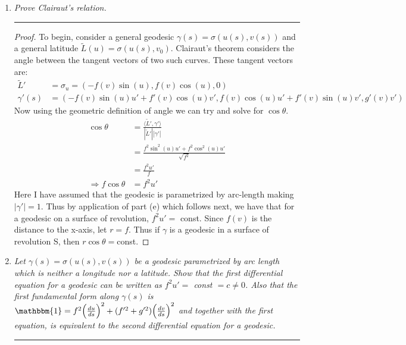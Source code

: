 \documentclass[a4paper, 11pt]{article}
\begin{document}
\begin{enumerate}[label=\alph*]
		\item \textit{Prove Clairaut's relation. }
		\par\noindent\rule{\textwidth}{0.4pt}
			\begin{proof}
				To begin, consider a general geodesic $\gamma(s)=\sigma(u(s),v(s))$ and a general latitude $\tilde{L}(u) = \sigma(u(s), v_0)$. Clairaut's theorem considers the angle between the tangent vectors of two such curves. These tangent vectors are: 
					\begin{align*}
						\tilde{L}' &= \sigma_u = (-f(v)\sin(u), f(v)\cos(u), 0) \\ 
						\gamma'(s) &= (-f(v)\sin(u)u'+f'(v)\cos(u)v', f(v)\cos(u)u'+f'(v)\sin(u)v', g'(v)v')
					\end{align*}
				Now using the geometric definition of angle we can try and solve for $\cos\theta$. 
					\begin{align*}
						\cos\theta &= \frac{\langle \tilde{L}', \gamma' \rangle}{|\tilde{L}'||\gamma'|} \\ 
							&= \frac{f^2\sin^2(u)u'+f^2\cos^2(u)u'}{\sqrt{f^2}}\\
							&= \frac{f^2u'}{f} \\
						\Rightarrow f\cos\theta &= f^2u'
					\end{align*}
				Here I have assumed that the geodesic is parametrized by arc-length making $|\gamma'|=1$. Thus by application of part (e) which follows next, we have that for a geodesic on a surface of revolution, $f^2u'=$ const. Since $f(v)$ is the distance to the x-axis, let $r=f$. Thus if $\gamma$ is a geodesic in a surface of revolution S, then $r\cos\theta =$const. 
			\end{proof}
		
		\item \textit{Let $\gamma(s) = \sigma(u(s),v(s))$ be a geodesic parametrized by arc length which is neither a longitude nor a latitude. Show that the first differential equation for a geodesic can be written as $f^2u' =$ const $= c\neq 0$. Also that the first fundamental form along $\gamma(s)$ is $\mathbbm{1}=f^2\Big(\frac{du}{ds}\Big)^2 + (f'^2+g'^2)\Big(\frac{dv}{ds}\Big)^2$ and together with the first equation, is equivalent to the second differential equation for a geodesic. }
		
		\par\noindent\rule{\textwidth}{0.4pt}
		

\end{enumerate}
\end{document}
